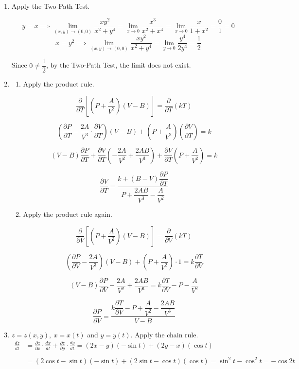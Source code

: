 \documentclass[a4paper, 12pt]{article}
\begin{document}
\begin{enumerate}[leftmargin=*,label=\textbf{\arabic*.}]
\newpage

\item Apply the Two-Path Test.

\[y=x\implies\lim_{(x,y)\to(0,0)}\frac{xy^2}{x^2+y^4}=\lim_{x\to0}\frac{x^3}{x^2+x^4}=\lim_{x\to0}\frac{x}{1+x^2}=\frac01=0\]
\[x=y^2\implies\lim_{(x,y)\to(0,0)}\frac{xy^2}{x^2+y^4}=\lim_{y\to0}\frac{y^4}{2y^4}=\frac12\]

Since $0\neq\dfrac12$, by the Two-Path Test, the limit does not exist.

\item \begin{enumerate}[leftmargin=*,label=\textbf{\alph*.}]
\item Apply the product rule.

\[\frac\partial{\partial T}\left[\left(P+\frac A{V^2}\right)(V-B)\right]=\frac\partial{\partial T}\left(kT\right)\]

\[\left(\frac{\partial P}{\partial T}-\frac{2A}{V^3}\cdot\frac{\partial V}{\partial T}\right)(V-B)+\left(P+\frac A{V^2}\right)\left(\frac{\partial V}{\partial T}\right)=k\]

\[(V-B)\frac{\partial P}{\partial T}+\frac{\partial V}{\partial T}\left(-\frac{2A}{V^2}+\frac{2AB}{V^3}\right)+\frac{\partial V}{\partial T}\left(P+\frac{A}{V^2}\right)=k\]

\[\boxed{\frac{\partial V}{\partial T}=\frac{k+(B-V)\dfrac{\partial P}{\partial T}}{P+\dfrac{2AB}{V^3}-\dfrac{A}{V^2}}}\]

\item Apply the product rule again.

\[\frac\partial{\partial V}\left[\left(P+\frac A{V^2}\right)(V-B)\right]=\frac\partial{\partial V}\left(kT\right)\]

\[\left(\frac{\partial P}{\partial V}-\frac{2A}{V^3}\right)(V-B)+\left(P+\frac A{V^2}\right)\cdot1=k\frac{\partial T}{\partial V}\]

\[(V-B)\frac{\partial P}{\partial V}-\frac{2A}{V^2}+\frac{2AB}{V^3}=k\frac{\partial T}{\partial V}-P-\frac A{V^2}\]

\[\boxed{\frac{\partial P}{\partial V}=\frac{k\dfrac{\partial T}{\partial V}-P+\dfrac A{V^2}-\dfrac{2AB}{V^3}}{V-B}}\]

\end{enumerate}

\item $z=z(x,y),\:x=x(t)$ and $y=y(t)$. Apply the chain rule.
\begin{align*}\frac{dz}{dt}&=\frac{\partial z}{\partial x}\cdot\frac{dx}{dt}+\frac{\partial z}{\partial y}\cdot\frac{dy}{dt}=(2x-y)(-\sin t)+(2y-x)(\cos t)\\\\&=(2\cos t-\sin t)(-\sin t)+(2\sin t-\cos t)(\cos t)=\sin^2t-\cos^2t=-\cos2t\end{align*}


\end{enumerate}
\end{document}
